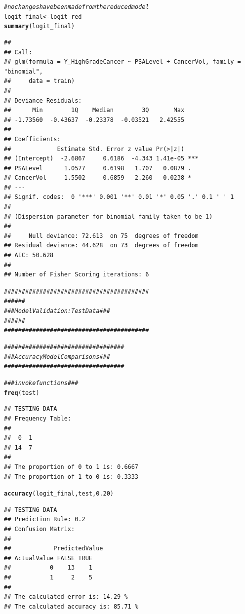 \documentclass{article}\usepackage[]{graphicx}\usepackage[]{color}
\makeatletter
\newcommand{\hlnum}[1]{\textcolor[rgb]{0.686,0.059,0.569}{#1}}%
\newcommand{\hlcom}[1]{\textcolor[rgb]{0.678,0.584,0.686}{\textit{#1}}}%
\newcommand{\hlstd}[1]{\textcolor[rgb]{0.345,0.345,0.345}{#1}}%
\newcommand{\hlkwb}[1]{\textcolor[rgb]{0.69,0.353,0.396}{#1}}%
\newcommand{\hlkwd}[1]{\textcolor[rgb]{0.737,0.353,0.396}{\textbf{#1}}}%
\newenvironment{kframe}{%
 \def\at@end@of@kframe{}%
 \ifinner\ifhmode%
  \def\at@end@of@kframe{\end{minipage}}%
  \begin{minipage}{\columnwidth}%
 \fi\fi%
 \def\FrameCommand##1{\hskip\@totalleftmargin \hskip-\fboxsep
 \colorbox{shadecolor}{##1}\hskip-\fboxsep
     \hskip-\linewidth \hskip-\@totalleftmargin \hskip\columnwidth}%
 \MakeFramed {\advance\hsize-\width
   \@totalleftmargin\z@ \linewidth\hsize
   \@setminipage}}%
 {\par\unskip\endMakeFramed%
 \at@end@of@kframe}
\newenvironment{knitrout}{}{} %
\makeatother
\begin{document}
\begin{knitrout}
\begin{kframe}
\begin{alltt}
\hlcom{# no changes have been made from the reduced model}
\hlstd{logit_final} \hlkwb{<-} \hlstd{logit_red}
\hlkwd{summary}\hlstd{(logit_final)}
\end{alltt}
\begin{verbatim}
## 
## Call:
## glm(formula = Y_HighGradeCancer ~ PSALevel + CancerVol, family = "binomial", 
##     data = train)
## 
## Deviance Residuals: 
##      Min        1Q    Median        3Q       Max  
## -1.73560  -0.43637  -0.23378  -0.03521   2.42555  
## 
## Coefficients:
##             Estimate Std. Error z value Pr(>|z|)    
## (Intercept)  -2.6867     0.6186  -4.343 1.41e-05 ***
## PSALevel      1.0577     0.6198   1.707   0.0879 .  
## CancerVol     1.5502     0.6859   2.260   0.0238 *  
## ---
## Signif. codes:  0 '***' 0.001 '**' 0.01 '*' 0.05 '.' 0.1 ' ' 1
## 
## (Dispersion parameter for binomial family taken to be 1)
## 
##     Null deviance: 72.613  on 75  degrees of freedom
## Residual deviance: 44.628  on 73  degrees of freedom
## AIC: 50.628
## 
## Number of Fisher Scoring iterations: 6
\end{verbatim}
\begin{alltt}
\hlcom{#########################################}
\hlcom{###                                   ###}
\hlcom{###    Model Validation: Test Data    ###}
\hlcom{###                                   ###}
\hlcom{#########################################}

\hlcom{##################################}
\hlcom{### Accuracy Model Comparisons ###}
\hlcom{##################################}

\hlcom{### invoke functions ###}
\hlkwd{freq}\hlstd{(test)}
\end{alltt}
\begin{verbatim}
## TESTING DATA
## Frequency Table:
## 
##  0  1 
## 14  7 
## 
## The proportion of 0 to 1 is: 0.6667 
## The proportion of 1 to 0 is: 0.3333
\end{verbatim}
\begin{alltt}
\hlkwd{accuracy}\hlstd{(logit_final, test,} \hlnum{0.20}\hlstd{)}
\end{alltt}
\begin{verbatim}
## TESTING DATA
## Prediction Rule: 0.2 
## Confusion Matrix:
##  
##            PredictedValue
## ActualValue FALSE TRUE
##           0    13    1
##           1     2    5
## 
## The calculated error is: 14.29 %
## The calculated accuracy is: 85.71 %
\end{verbatim}
\end{kframe}
\end{knitrout}
\end{document}
